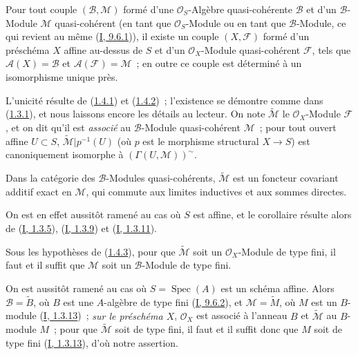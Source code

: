 \begin{proposition}[1.4.3]
\label{II.1.4.3-fr}
Pour tout couple $(\mathcal{B},\mathcal{M})$ formé d'une
$\mathcal{O}_S$-Algèbre quasi-cohérente $\mathcal{B}$ et d'un
$\mathcal{B}$-Module $\mathcal{M}$ quasi-cohérent (en tant que
$\mathcal{O}_S$-Module ou en tant que $\mathcal{B}$-Module, ce qui revient au
même (\hyperref[I.9.6.1-fr]{I, 9.6.1})), il existe un couple
$(X,\mathcal{F})$ formé d'un préschéma $X$ affine au-dessus de $S$ et d'un
$\mathcal{O}_X$-Module quasi-cohérent $\mathcal{F}$, tels que
$\mathcal{A}(X)=\mathcal{B}$ et $\mathcal{A}(\mathcal{F})=\mathcal{M}$~; en
outre ce couple est déterminé à un isomorphisme unique près.
\end{proposition}

L'unicité résulte de (\hyperref[II.1.4.1-fr]{1.4.1}) et
(\hyperref[II.1.4.2-fr]{1.4.2})~; l'existence se démontre comme dans
(\hyperref[II.1.3.1-fr]{1.3.1}), et nous laissons encore les détails au
lecteur. On note $\widetilde{\mathcal{M}}$ le $\mathcal{O}_X$-Module
$\mathcal{F}$, et on dit qu'il est \emph{associé} au $\mathcal{B}$-Module
quasi-cohérent $\mathcal{M}$~; pour tout ouvert affine $U\subset S$,
$\widetilde{\mathcal{M}}|p^{-1}(U)$ (où $p$ est le morphisme structural
$X\to S$) est canoniquement isomorphe à
$(\Gamma(U,\mathcal{M}))^{\sim}$.

\begin{corollary}[1.4.4]
\label{II.1.4.4-fr}
Dans la catégorie des $\mathcal{B}$-Modules quasi-cohérents,
$\widetilde{\mathcal{M}}$ est un foncteur covariant additif exact en
$\mathcal{M}$, qui commute aux limites inductives et aux sommes directes.
\end{corollary}

On est en effet aussitôt ramené au cas où $S$ est affine, et le corollaire
résulte alors de (\hyperref[I.1.3.5-fr]{I, 1.3.5}),
(\hyperref[I.1.3.9-fr]{I, 1.3.9}) et
(\hyperref[I.1.3.11-fr]{I, 1.3.11}).

\begin{corollary}[1.4.5]
\label{II.1.4.5-fr}
Sous les hypothèses de (\hyperref[II.1.4.3-fr]{1.4.3}), pour que
$\widetilde{\mathcal{M}}$ soit un $\mathcal{O}_X$-Module de type fini, il faut
et il suffit que $\mathcal{M}$ soit un $\mathcal{B}$-Module de type fini.
\end{corollary}

On est aussitôt ramené au cas où $S=\operatorname{Spec}(A)$ est un schéma
affine. Alors $\mathcal{B}=\widetilde{B}$, où $B$ est une $A$-algèbre de type
fini (\hyperref[I.9.6.2-fr]{I, 9.6.2}), et
$\mathcal{M}=\widetilde{M}$, où $M$ est un $B$-module
(\hyperref[I.1.3.13-fr]{I, 1.3.13})~; \emph{sur le préschéma $X$},
$\mathcal{O}_X$ est associé à l'anneau $B$ et
$\widetilde{\mathcal{M}}$ au $B$-module $M$~; pour que
$\widetilde{\mathcal{M}}$ soit de type fini, il faut et il suffit donc que
$M$ soit de type fini (\hyperref[I.1.3.13-fr]{I, 1.3.13}), d'où notre
assertion.

